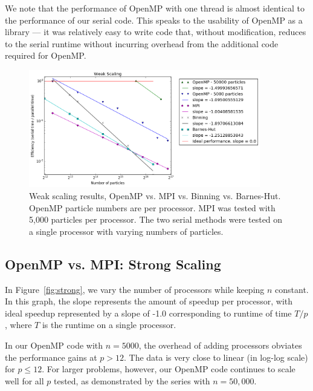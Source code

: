\documentclass{article}
\begin{document}
We note that the performance of OpenMP with one thread is almost identical to
the performance of our serial code. This speaks to the usability of OpenMP as a
library --- it was relatively easy to write code that, without modification,
reduces to the serial runtime without incurring overhead from the
additional code required for OpenMP.
\begin{figure}[ht!]
\centering
\includegraphics[width=0.9\textwidth]{weak.png}
\caption{Weak scaling results, OpenMP vs. MPI vs. Binning vs.
Barnes-Hut. OpenMP particle numbers are per processor. MPI was tested
with 5,000 particles per processor. The two serial methods were tested
on a single processor with varying numbers of particles.}\label{fig:weak}
\end{figure}

\subsection{OpenMP vs. MPI: Strong Scaling}
In Figure~\ref{fig:strong}, we vary the number of processors while keeping $n$
constant. In this graph, the slope represents the amount of speedup per
processor, with ideal speedup represented by a slope of -1.0 corresponding to
runtime of time $T/p$, where $T$ is the runtime on a single processor.

In our OpenMP code with $n=5000$, the overhead of adding processors obviates the
performance gains at $p > 12$. The data is very close to linear (in log-log
scale) for $p \le 12$. For larger problems, however, our OpenMP code continues
to scale well for all $p$ tested, as demonstrated by the series with $n=50,000$.
\end{document}
